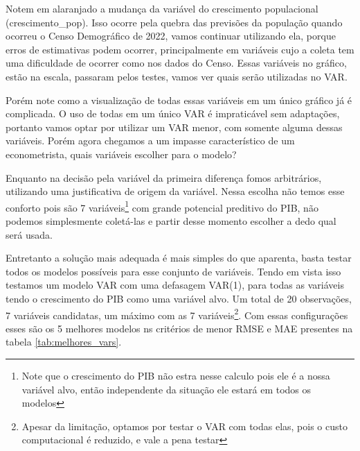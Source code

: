 Notem em alaranjado a mudança da variável do crescimento populacional (crescimento\_pop). Isso ocorre pela quebra das previsões da população quando ocorreu o Censo Demográfico de 2022, vamos continuar utilizando ela, porque erros de estimativas podem ocorrer, principalmente em variáveis cujo a coleta tem uma dificuldade de ocorrer como nos dados do Censo. Essas variáveis no gráfico, estão na escala, passaram pelos testes, vamos ver quais serão utilizadas no VAR.

Porém note como a visualização de todas essas variáveis em um único gráfico já é complicada. O uso de todas em um único VAR é impraticável sem adaptações, portanto vamos optar por utilizar um VAR menor, com somente alguma dessas variáveis. Porém agora chegamos a um impasse característico de um econometrista, quais variáveis escolher para o modelo? 

Enquanto na decisão pela variável da primeira diferença fomos arbitrários, utilizando uma justificativa de origem da variável. Nessa escolha não temos esse conforto pois são 7 variáveis\footnote{Note que o crescimento do PIB não estra nesse calculo pois ele é a nossa variável alvo, então independente da situação ele estará em todos os modelos} com grande potencial preditivo do PIB, não podemos simplesmente coletá-las e partir desse momento escolher a dedo qual será usada. 

Entretanto a solução mais adequada é mais simples do que aparenta, basta testar todos os modelos possíveis para esse conjunto de variáveis. Tendo em vista isso testamos um modelo VAR com uma defasagem VAR(1), para todas as variáveis tendo o crescimento do PIB como uma variável alvo. Um total de 20 observações, 7 variáveis candidatas, um máximo com as 7 variáveis\footnote{Apesar da limitação, optamos por testar o VAR com todas elas, pois o custo computacional é reduzido, e vale a pena testar}. Com essas configurações esses são os 5 melhores modelos ns critérios de menor RMSE e MAE presentes na tabela \ref{tab:melhores_vars}.

